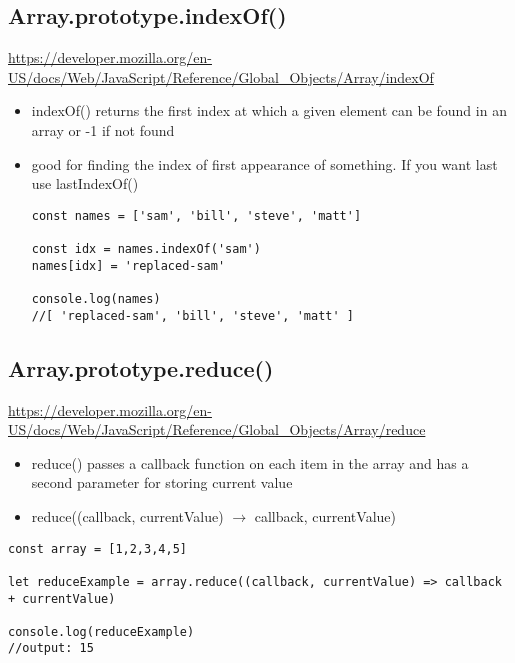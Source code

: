 \documentclass[10pt]{article}
\begin{document}
\medskip %
\pagebreak
\subsection{Array.prototype.indexOf()}
\url{https://developer.mozilla.org/en-US/docs/Web/JavaScript/Reference/Global_Objects/Array/indexOf}

\begin{itemize}
	\item indexOf() returns the first index at which a given element can be found in an array or -1 if not found
	\item good for finding the index of first appearance of something. If you want last use lastIndexOf()
	
\begin{lstlisting}[title=Example indexOf(), captionpos=t]
const names = ['sam', 'bill', 'steve', 'matt']

const idx = names.indexOf('sam')
names[idx] = 'replaced-sam'

console.log(names)
//[ 'replaced-sam', 'bill', 'steve', 'matt' ]
\end{lstlisting}
\end{itemize}
\medskip %


\medskip %
\pagebreak
\subsection{Array.prototype.reduce()}
\url{https://developer.mozilla.org/en-US/docs/Web/JavaScript/Reference/Global_Objects/Array/reduce}

\begin{itemize}
	\item reduce() passes a callback function on each item in the array and has a second parameter for storing current value
	\item reduce((callback, currentValue) $\rightarrow$ callback, currentValue) 
\end{itemize}

	
\begin{lstlisting}[title=Example reduce(), captionpos=t]
const array = [1,2,3,4,5]

let reduceExample = array.reduce((callback, currentValue) => callback + currentValue)

console.log(reduceExample)
//output: 15
\end{lstlisting}
\medskip %


\medskip %
\pagebreak
\end{document}
